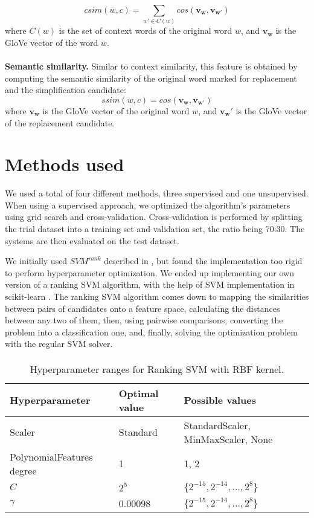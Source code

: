 \documentclass[10pt, a4paper]{article}
\begin{document}
\[ csim(w, c) = \sum_{w' \in C(w)} cos(\mathbf{v_w}, \mathbf{v_{w'}}) \]
where $C(w)$ is the set of context words of the original word $w$, and $\mathbf{v_w}$ is the GloVe vector of the word $w$. \paragraph{}
\textbf{Semantic similarity.} Similar to context similarity, this feature is obtained by computing the semantic similarity of the original word marked for replacement and the simplification candidate:
\[ ssim(w, c) = cos(\mathbf{v_w}, \mathbf{v_{w'}}) \]
where $\mathbf{v_w}$ is the GloVe vector of the original word $w$, and $\mathbf{v_w'}$ is the GloVe vector of the replacement candidate.

\section{Methods used}

We used a total of four different methods, three supervised and one unsupervised. When using a supervised approach, we optimized the algorithm's parameters using grid search and cross-validation. Cross-validation is performed by splitting the trial dataset into a training set and validation set, the ratio being 70:30. The systems are then evaluated on the test dataset.

We initially used  $\textit{SVM}^{\textit{rank}}$ described in \citep{joachims2006training}, but found the implementation too rigid to perform hyperparameter optimization. We ended up implementing our own version of a ranking SVM algorithm, with the help of SVM implementation in scikit-learn \citep{pedregosa2011scikit}. The ranking SVM algorithm comes down to mapping the similarities between pairs of candidates onto a feature space, calculating the distances between any two of them, then, using pairwise comparisons, converting the problem into a classification one, and, finally, solving the optimization problem with the regular SVM solver.

\paragraph{}

\begin{table*}
\caption{Hyperparameter ranges for Ranking SVM with RBF kernel.}
\label{tab:rbf-params}
\begin{center}
\begin{tabular}{lll}
\toprule
Hyperparameter & Optimal value & Possible values \\
\midrule
Scaler & Standard &  StandardScaler, MinMaxScaler, None \\
PolynomialFeatures degree & 1 & 1, 2  \\
$C$ & $2^5$ & $\{2^{-15}, 2^{-14}, \ldots, 2^{8}\}$ \\
$\gamma$ & 0.00098 & $\{2^{-15}, 2^{-14}, \ldots, 2^{8}\}$ \\
\bottomrule
\end{tabular}
\end{center}
\end{table*}
\end{document}
